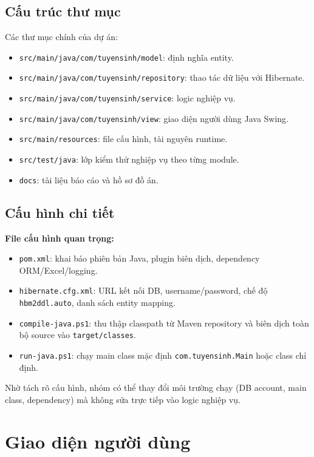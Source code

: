 \documentclass[12pt,a4paper,oneside]{report}
\begin{document}
\section{Cấu trúc thư mục}
Các thư mục chính của dự án:
\begin{itemize}
  \item \texttt{src/main/java/com/tuyensinh/model}: định nghĩa entity.
  \item \texttt{src/main/java/com/tuyensinh/repository}: thao tác dữ liệu với Hibernate.
  \item \texttt{src/main/java/com/tuyensinh/service}: logic nghiệp vụ.
  \item \texttt{src/main/java/com/tuyensinh/view}: giao diện người dùng Java Swing.
  \item \texttt{src/main/resources}: file cấu hình, tài nguyên runtime.
  \item \texttt{src/test/java}: lớp kiểm thử nghiệp vụ theo từng module.
  \item \texttt{docs}: tài liệu báo cáo và hồ sơ đồ án.
\end{itemize}

\section{Cấu hình chi tiết}
\textbf{File cấu hình quan trọng:}
\begin{itemize}
  \item \texttt{pom.xml}: khai báo phiên bản Java, plugin biên dịch, dependency ORM/Excel/logging.
  \item \texttt{hibernate.cfg.xml}: URL kết nối DB, username/password, chế độ \texttt{hbm2ddl.auto}, danh sách entity mapping.
  \item \texttt{compile-java.ps1}: thu thập classpath từ Maven repository và biên dịch toàn bộ source vào \texttt{target/classes}.
  \item \texttt{run-java.ps1}: chạy main class mặc định \texttt{com.tuyensinh.Main} hoặc class chỉ định.
\end{itemize}

Nhờ tách rõ cấu hình, nhóm có thể thay đổi môi trường chạy (DB account, main class, dependency) mà không sửa trực tiếp vào logic nghiệp vụ.

\chapter{Giao diện người dùng}
\end{document}
